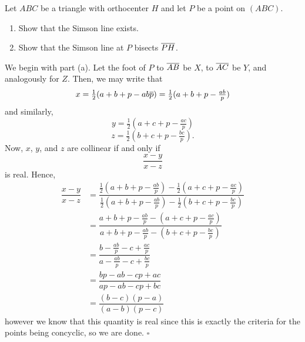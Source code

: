 \documentclass{article}
\begin{document}
\begin{problem}[6.22]{}
Let $ABC$ be a triangle with orthocenter $H$ and let $P$ be a point on $(ABC)$.
\begin{enumerate}[label=(\alph*)]
\item Show that the Simson line exists.
\item Show that the Simson line at $P$ bisects $\overline{PH}$.
\end{enumerate}
\end{problem}

We begin with part (a). Let the foot of $P$ to $\overline{AB}$ be $X$, to $\overline{AC}$ be $Y$, and analogously for $Z$. Then, we may write that \[x = \tfrac{1}{2}(a+b+p-ab\overline{p}) = \tfrac{1}{2}(a+b+p-\tfrac{ab}{p})\] and similarly, \[y = \tfrac{1}{2}(a+c+p-\tfrac{ac}{p})\] \[z = \tfrac{1}{2}(b+c+p-\tfrac{bc}{p}).\] Now, $x$, $y$, and $z$ are collinear if and only if \[\dfrac{x-y}{x-z}\] is real. Hence,
\begin{align*}
\dfrac{x-y}{x-z} &= \dfrac{\tfrac{1}{2}(a+b+p-\tfrac{ab}{p})-\tfrac{1}{2}(a+c+p-\tfrac{ac}{p})}{\tfrac{1}{2}(a+b+p-\tfrac{ab}{p})-\tfrac{1}{2}(b+c+p-\tfrac{bc}{p})} \\
&= \dfrac{a+b+p-\tfrac{ab}{p}-(a+c+p-\tfrac{ac}{p})}{a+b+p-\tfrac{ab}{p}-(b+c+p-\tfrac{bc}{p})} \\
&= \dfrac{b-\tfrac{ab}{p}-c+\tfrac{ac}{p}}{a-\tfrac{ab}{p}-c+\tfrac{bc}{p}} \\
&= \dfrac{bp-ab-cp+ac}{ap-ab-cp+bc} \\
&= \dfrac{(b-c)(p-a)}{(a-b)(p-c)}
\end{align*}
however we know that this quantity is real since this is exactly the criteria for the points being concyclic, so we are done. $\square$
\end{document}
